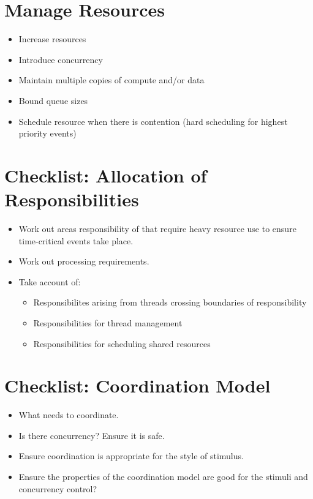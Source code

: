 \documentclass[a4paper]{report}
\begin{document}
\section{Manage Resources}

\begin{itemize}
\item{Increase resources}
\item{Introduce concurrency}
\item{Maintain multiple copies of compute and/or data}
\item{Bound queue sizes}
\item{Schedule resource when there is contention (hard scheduling for highest priority events)}
\end{itemize}

\section{Checklist: Allocation of Responsibilities}
\begin{itemize}
\item{Work out areas responsibility of that require heavy resource use to ensure time-critical events take place.}
\item{Work out processing requirements.}
\item{Take account of:
	\begin{itemize}
	\item{Responsibilites arising from threads crossing boundaries of responsibility}
	\item{Responsibilities for thread management}
	\item{Responsibilities for scheduling shared resources}
	\end{itemize}
}
\end{itemize}

\section{Checklist: Coordination Model }
\begin{itemize}
\item{What needs to coordinate.}
\item{Is there concurrency?  Ensure it is safe.}
\item{Ensure coordination is appropriate for the style of stimulus.}
\item{Ensure the properties of the coordination model are good for the stimuli and concurrency control?}
\end{itemize}
\end{document}

